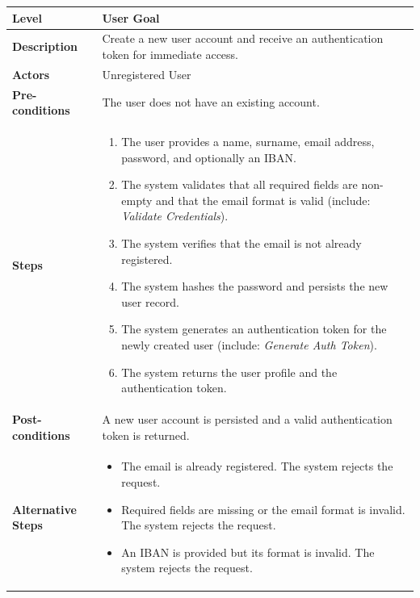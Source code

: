 \begin{longtable}{|p{3.5cm}|p{10.3cm}|}
\hline
\rowcolor{UCRow} \textbf{Level} & User Goal \\ \hline
\textbf{Description} & Create a new user account and receive an authentication token for immediate access. \\ \hline
\rowcolor{UCRow} \textbf{Actors} & Unregistered User \\ \hline
\textbf{Pre-conditions} & The user does not have an existing account. \\ \hline
\rowcolor{UCRow} \textbf{Steps} &
\begin{enumerate}[nosep, leftmargin=*]
    \item The user provides a name, surname, email address, password, and optionally an IBAN.
    \item The system validates that all required fields are non-empty and that the email format is valid (include: \textit{Validate Credentials}).
    \item The system verifies that the email is not already registered.
    \item The system hashes the password and persists the new user record.
    \item The system generates an authentication token for the newly created user (include: \textit{Generate Auth Token}).
    \item The system returns the user profile and the authentication token.
\end{enumerate} \\ \hline
\textbf{Post-conditions} & A new user account is persisted and a valid authentication token is returned. \\ \hline
\rowcolor{UCRow} \textbf{Alternative Steps} &
\begin{itemize}[nosep, leftmargin=2.5em]
    \item[\textbf{A1.}] The email is already registered. The system rejects the request.
    \item[\textbf{A2.}] Required fields are missing or the email format is invalid. The system rejects the request.
    \item[\textbf{A3.}] An IBAN is provided but its format is invalid. The system rejects the request.
\end{itemize} \\ \hline
\end{longtable}

